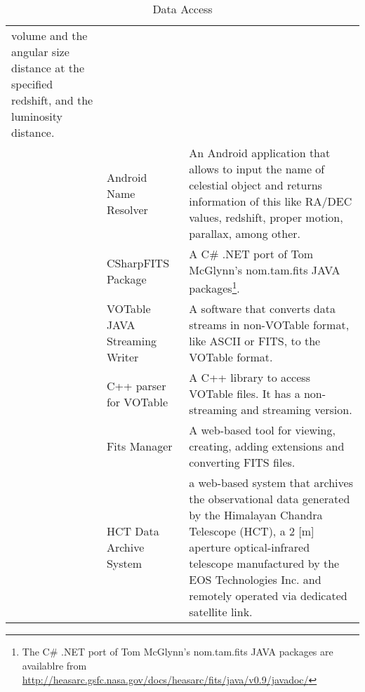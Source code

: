 \begin{table*}[h!t]
\begin{tabular}{|l|l|p{12.5cm}|}
									volume and the angular size distance at the specified redshift, and the luminosity distance.\\
			& Android Name Resolver & An Android application that allows to input the name of celestial object and returns information of this like 
									RA/DEC values, redshift, proper motion, parallax, among other.\\
			& CSharpFITS Package & A C\# .NET port of Tom McGlynn's nom.tam.fits JAVA packages\footnote{The C\# .NET port of Tom McGlynn's nom.tam.fits 
									JAVA packages are availablre from \url{http://heasarc.gsfc.nasa.gov/docs/heasarc/fits/java/v0.9/javadoc/}}.\\
			& VOTable JAVA Streaming Writer & A software that converts data streams in non-VOTable format, like ASCII or FITS, to the VOTable format. \\
			& C++ parser for VOTable & A C++ library to access VOTable files. It has a non-streaming and streaming version.\\
			& Fits Manager & A web-based tool for viewing, creating, adding extensions and converting FITS files.\\
			& HCT Data Archive System & a web-based system that archives the observational data generated by the Himalayan Chandra Telescope (HCT), a 2 [m]
									 aperture optical-infrared telescope manufactured by the EOS Technologies Inc. and remotely operated via dedicated
									 satellite link.\\
	\hline
	\end{tabular}
	\caption{Data Access}
	\label{table:da}
\end{table*}





